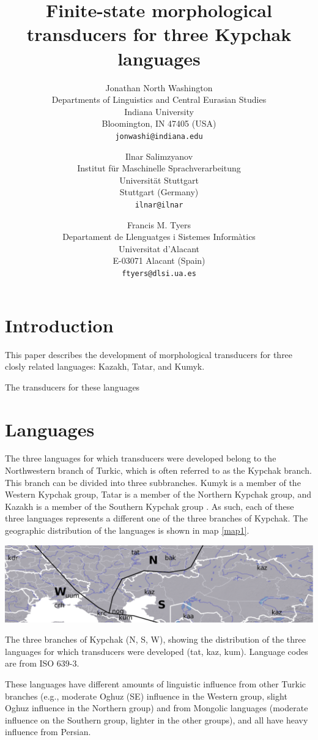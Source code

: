 \documentclass[a4paper,11pt,twocolumn]{article}
\title{Finite-state morphological transducers for three Kypchak languages}
\author{Jonathan North Washington \\
Departments of Linguistics and Central Eurasian Studies\\
Indiana University\\
Bloomington, IN 47405 (USA)\\
\texttt{jonwashi@indiana.edu} \and
Ilnar Salimzyanov  \\
Institut für Maschinelle Sprachverarbeitung \\
Universität Stuttgart\\
Stuttgart (Germany) \\
\texttt{ilnar@ilnar} \and 
Francis M. Tyers\\
Departament de Llenguatges i Sistemes Informàtics \\  
Universitat d'Alacant\\
E-03071 Alacant (Spain)\\
\texttt{ftyers@dlsi.ua.es} 
}
\begin{document}
\maketitleabstract{}

\section{Introduction}

This paper describes the development of morphological transducers for three closly related languages: Kazakh, Tatar, and Kumyk.


\cite{bekmanova2013}

The transducers for these languages 

\section{Languages}

The three languages for which transducers were developed belong to the Northwestern branch of Turkic, which is often referred to as the Kypchak branch.  This branch can be divided into three subbranches.  Kumyk is a member of the Western Kypchak group, Tatar is a member of the Northern Kypchak group, and Kazakh is a member of the Southern Kypchak group \citep[82-83]{histofturkic}.  As such, each of these three languages represents a different one of the three branches of Kypchak.  The geographic distribution of the languages is shown in map \ref{map1}.

\begin{map*}[htbp]
	\includegraphics[width=\textwidth]{map/map}
	\caption{The three branches of Kypchak (N, S, W), showing the distribution of the three languages for which transducers were developed (tat, kaz, kum).  Language codes are from ISO 639-3.}
	\label{map1}
\end{map*}

These languages have different amounts of linguistic influence from other Turkic branches (e.g., moderate Oghuz (SE) influence in the Western group, slight Oghuz influence in the Northern group) and from Mongolic languages (moderate influence on the Southern group, lighter in the other groups), and all have heavy influence from Persian.
\end{document}
